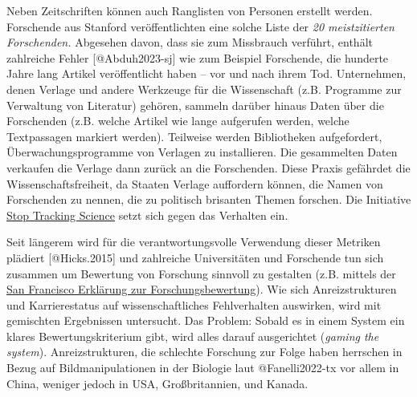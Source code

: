 \documentclass[
  letterpaper,
  DIV=11,
  numbers=noendperiod]{scrreprt}
\begin{document}
Neben Zeitschriften können auch Ranglisten von Personen erstellt werden.
Forschende aus Stanford veröffentlichten eine solche Liste der \emph{20
meistzitierten Forschenden.} Abgesehen davon, dass sie zum Missbrauch
verführt, enthält zahlreiche Fehler {[}@Abduh2023-sj{]} wie zum Beispiel
Forschende, die hunderte Jahre lang Artikel veröffentlicht haben -- vor
und nach ihrem Tod. Unternehmen, denen Verlage und andere Werkzeuge für
die Wissenschaft (z.B. Programme zur Verwaltung von Literatur) gehören,
sammeln darüber hinaus Daten über die Forschenden (z.B. welche Artikel
wie lange aufgerufen werden, welche Textpassagen markiert werden).
Teilweise werden Bibliotheken aufgefordert, Überwachungsprogramme von
Verlagen zu installieren. Die gesammelten Daten verkaufen die Verlage
dann zurück an die Forschenden. Diese Praxis gefährdet die
Wissenschaftsfreiheit, da Staaten Verlage auffordern können, die Namen
von Forschenden zu nennen, die zu politisch brisanten Themen forschen.
Die Initiative \href{https://stoptrackingscience.eu}{Stop Tracking
Science} setzt sich gegen das Verhalten ein.

Seit längerem wird für die verantwortungsvolle Verwendung dieser
Metriken plädiert {[}@Hicks.2015{]} und zahlreiche Universitäten und
Forschende tun sich zusammen um Bewertung von Forschung sinnvoll zu
gestalten (z.B. mittels der
\href{https://sfdora.org/read/read-the-declaration-deutsch/}{San
Francisco Erklärung zur Forschungsbewertung}). Wie sich Anreizstrukturen
und Karrierestatus auf wissenschaftliches Fehlverhalten auswirken, wird
mit gemischten Ergebnissen untersucht. Das Problem: Sobald es in einem
System ein klares Bewertungskriterium gibt, wird alles darauf
ausgerichtet (\emph{gaming the system}). Anreizstrukturen, die schlechte
Forschung zur Folge haben herrschen in Bezug auf Bildmanipulationen in
der Biologie laut @Fanelli2022-tx vor allem in China, weniger jedoch in
USA, Großbritannien, und Kanada.
\end{document}
